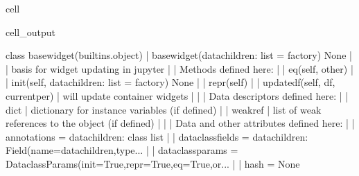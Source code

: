 \documentclass[letterpaper,10pt,english]{jupyterBook}
\begin{document}
\begin{sphinxuseclass}{cell}
\begin{sphinxVerbatimOutput}
\begin{sphinxuseclass}{cell_output}
\begin{sphinxVerbatim}[commandchars=\\\{\}]
    class basewidget(builtins.object)
     |  basewidget(datachildren: list = \PYGZlt{}factory\PYGZgt{}) \PYGZhy{}\PYGZgt{} None
     |  
     |  basis for widget updating in jupyter
     |  
     |  Methods defined here:
     |  
     |  \PYGZus{}\PYGZus{}eq\PYGZus{}\PYGZus{}(self, other)
     |  
     |  \PYGZus{}\PYGZus{}init\PYGZus{}\PYGZus{}(self, datachildren: list = \PYGZlt{}factory\PYGZgt{}) \PYGZhy{}\PYGZgt{} None
     |  
     |  \PYGZus{}\PYGZus{}repr\PYGZus{}\PYGZus{}(self)
     |  
     |  update\PYGZus{}df(self, df, current\PYGZus{}per)
     |      will update container widgets
     |  
     |  \PYGZhy{}\PYGZhy{}\PYGZhy{}\PYGZhy{}\PYGZhy{}\PYGZhy{}\PYGZhy{}\PYGZhy{}\PYGZhy{}\PYGZhy{}\PYGZhy{}\PYGZhy{}\PYGZhy{}\PYGZhy{}\PYGZhy{}\PYGZhy{}\PYGZhy{}\PYGZhy{}\PYGZhy{}\PYGZhy{}\PYGZhy{}\PYGZhy{}\PYGZhy{}\PYGZhy{}\PYGZhy{}\PYGZhy{}\PYGZhy{}\PYGZhy{}\PYGZhy{}\PYGZhy{}\PYGZhy{}\PYGZhy{}\PYGZhy{}\PYGZhy{}\PYGZhy{}\PYGZhy{}\PYGZhy{}\PYGZhy{}\PYGZhy{}\PYGZhy{}\PYGZhy{}\PYGZhy{}\PYGZhy{}\PYGZhy{}\PYGZhy{}\PYGZhy{}\PYGZhy{}\PYGZhy{}\PYGZhy{}\PYGZhy{}\PYGZhy{}\PYGZhy{}\PYGZhy{}\PYGZhy{}\PYGZhy{}\PYGZhy{}\PYGZhy{}\PYGZhy{}\PYGZhy{}\PYGZhy{}\PYGZhy{}\PYGZhy{}\PYGZhy{}\PYGZhy{}\PYGZhy{}\PYGZhy{}\PYGZhy{}\PYGZhy{}\PYGZhy{}\PYGZhy{}
     |  Data descriptors defined here:
     |  
     |  \PYGZus{}\PYGZus{}dict\PYGZus{}\PYGZus{}
     |      dictionary for instance variables (if defined)
     |  
     |  \PYGZus{}\PYGZus{}weakref\PYGZus{}\PYGZus{}
     |      list of weak references to the object (if defined)
     |  
     |  \PYGZhy{}\PYGZhy{}\PYGZhy{}\PYGZhy{}\PYGZhy{}\PYGZhy{}\PYGZhy{}\PYGZhy{}\PYGZhy{}\PYGZhy{}\PYGZhy{}\PYGZhy{}\PYGZhy{}\PYGZhy{}\PYGZhy{}\PYGZhy{}\PYGZhy{}\PYGZhy{}\PYGZhy{}\PYGZhy{}\PYGZhy{}\PYGZhy{}\PYGZhy{}\PYGZhy{}\PYGZhy{}\PYGZhy{}\PYGZhy{}\PYGZhy{}\PYGZhy{}\PYGZhy{}\PYGZhy{}\PYGZhy{}\PYGZhy{}\PYGZhy{}\PYGZhy{}\PYGZhy{}\PYGZhy{}\PYGZhy{}\PYGZhy{}\PYGZhy{}\PYGZhy{}\PYGZhy{}\PYGZhy{}\PYGZhy{}\PYGZhy{}\PYGZhy{}\PYGZhy{}\PYGZhy{}\PYGZhy{}\PYGZhy{}\PYGZhy{}\PYGZhy{}\PYGZhy{}\PYGZhy{}\PYGZhy{}\PYGZhy{}\PYGZhy{}\PYGZhy{}\PYGZhy{}\PYGZhy{}\PYGZhy{}\PYGZhy{}\PYGZhy{}\PYGZhy{}\PYGZhy{}\PYGZhy{}\PYGZhy{}\PYGZhy{}\PYGZhy{}\PYGZhy{}
     |  Data and other attributes defined here:
     |  
     |  \PYGZus{}\PYGZus{}annotations\PYGZus{}\PYGZus{} = \PYGZob{}\PYGZsq{}datachildren\PYGZsq{}: \PYGZlt{}class \PYGZsq{}list\PYGZsq{}\PYGZgt{}\PYGZcb{}
     |  
     |  \PYGZus{}\PYGZus{}dataclass\PYGZus{}fields\PYGZus{}\PYGZus{} = \PYGZob{}\PYGZsq{}datachildren\PYGZsq{}: Field(name=\PYGZsq{}datachildren\PYGZsq{},type...
     |  
     |  \PYGZus{}\PYGZus{}dataclass\PYGZus{}params\PYGZus{}\PYGZus{} = \PYGZus{}DataclassParams(init=True,repr=True,eq=True,or...
     |  
     |  \PYGZus{}\PYGZus{}hash\PYGZus{}\PYGZus{} = None
    

\end{sphinxVerbatim}
\end{sphinxuseclass}
\end{sphinxVerbatimOutput}
\end{sphinxuseclass}
\end{document}
